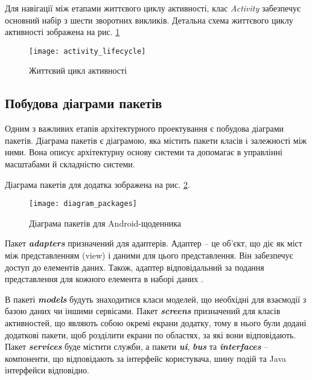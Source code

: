 \documentclass[../main.tex]{subfiles}
\begin{document}
Для навігації між етапами життєвого циклу активності, клас \textit{Activity} забезпечує основний набір з шести зворотних викликів. Детальна схема життєвого циклу активності зображена  на рис. \ref{diagram:activity_lifecycle}

\begin{figure}[H]
	\centering
	\texttt{[image: activity\_lifecycle]}
	\caption{Життєвий цикл активності}
	\label{diagram:activity_lifecycle}
\end{figure}

\subsection{Побудова діаграми пакетів}
Одним з важливих етапів архітектурного проектування є побудова діаграми пакетів. Діаграма пакетів є діаграмою, яка містить пакети класів і залежності між ними. Вона описує архітектурну основу системи та допомагає в управлінні масштабами й складністю системи. 

Діаграма пакетів для додатка зображена на рис. \ref{diagram:packages}.
\vspace{\baselineskip}

\begin{figure}[H]
	\centering
	\texttt{[image: diagram\_packages]}
	\caption{Діаграма пакетів для Android-щоденника}
	\label{diagram:packages}
\end{figure}

Пакет \textit{\textbf{adapters}} призначений для адаптерів. Адаптер -- це об'єкт, що діє як міст між представленням (view) і даними для цього представлення. Він забезпечує доступ до елементів даних. Також, адаптер відповідальний за подання представлення для кожного елемента в наборі даних \cite{adapter}. 

В пакеті \textit{\textbf{models}} будуть знаходитися класи моделей, що необхідні для взаємодії з базою даних чи іншими сервісами. Пакет \textit{\textbf{screens}} призначений для класів активностей, що являють собою окремі екрани додатку, тому в нього були додані додаткові пакети, щоб розділити екрани по областях, за які вони відповідають. Пакет \textit{\textbf{services}} буде містити служби, а пакети \textit{\textbf{ui}}, \textit{\textbf{bus}} та \textit{\textbf{interfaces}} -- компоненти, що відповідають за інтерфейс користувача, шину подій та Java інтерфейси відповідно. 

\end{document}
